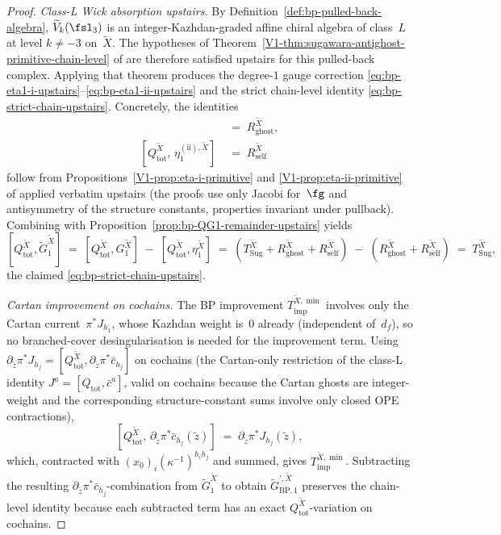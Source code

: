 \begin{proof}
\emph{Class-L Wick absorption upstairs.}
By
Definition~\ref{def:bp-pulled-back-algebra}, $\widetilde V_k(\fsl_3)$
is an integer-Kazhdan-graded affine chiral algebra of class~$L$ at
level $k \ne -3$ on~$\widetilde X$. The hypotheses of
Theorem~\ref{V1-thm:sugawara-antighost-primitive-chain-level} of
\cite[\S\ref*{V1-sec:strict-chain-level}]{Vol1-class-L-antighost}
are therefore satisfied upstairs for this pulled-back complex.
Applying that theorem produces the degree-$1$ gauge correction
\eqref{eq:bp-eta1-i-upstairs}--\eqref{eq:bp-eta1-ii-upstairs} and
the strict chain-level identity
\eqref{eq:bp-strict-chain-upstairs}. Concretely, the identities
\begin{align*}
 [Q_{\mathrm{tot}}^{\widetilde X},\, \eta_1^{(\mathrm i), \widetilde X}]
 &\;=\; R_{\mathrm{ghost}}^{\widetilde X},\\
 [Q_{\mathrm{tot}}^{\widetilde X},\, \eta_1^{(\mathrm{ii}), \widetilde X}]
 &\;=\; R_{\mathrm{self}}^{\widetilde X}
\end{align*}
follow from Propositions~\ref{V1-prop:eta-i-primitive} and
\ref{V1-prop:eta-ii-primitive} of
\cite[\S\ref*{V1-sec:eta1}]{Vol1-class-L-antighost} applied verbatim
upstairs (the proofs use only Jacobi for~$\fg$ and antisymmetry of
the structure constants, properties invariant under pullback).
Combining with
Proposition~\ref{prop:bp-QG1-remainder-upstairs} yields
\[
 [Q_{\mathrm{tot}}^{\widetilde X}, \widetilde G_1^{\widetilde X}]
 \;=\; [Q_{\mathrm{tot}}^{\widetilde X}, G_1^{\widetilde X}]
 \;-\; [Q_{\mathrm{tot}}^{\widetilde X}, \eta_1^{\widetilde X}]
 \;=\; (T_{\mathrm{Sug}}^{\widetilde X} + R_{\mathrm{ghost}}^{\widetilde X} + R_{\mathrm{self}}^{\widetilde X})
 \;-\; (R_{\mathrm{ghost}}^{\widetilde X} + R_{\mathrm{self}}^{\widetilde X})
 \;=\; T_{\mathrm{Sug}}^{\widetilde X},
\]
the claimed \eqref{eq:bp-strict-chain-upstairs}.

\emph{Cartan improvement on cochains.}
The BP improvement
$T_{\mathrm{imp}}^{\widetilde X, \min}$ involves only the Cartan
current~$\pi^{\ast}J_{h_1}$, whose Kazhdan weight is~$0$ already
(independent of~$d_f$), so no branched-cover desingularisation is
needed for the improvement term. Using
$\partial_{\tilde z}\pi^{\ast}J_{h_j} = [Q_{\mathrm{tot}}^{\widetilde X},
 \partial_{\tilde z}\pi^{\ast}\bar c_{h_j}]$ on cochains (the
Cartan-only restriction of the class-L identity
$J^a = [Q_{\mathrm{tot}}, \bar c^a]$, valid on cochains because the
Cartan ghosts are integer-weight and the corresponding structure-constant
sums involve only closed OPE contractions),
\[
 [Q_{\mathrm{tot}}^{\widetilde X},\,
 \partial_{\tilde z}\pi^{\ast}\bar c_{h_j}(\tilde z)]
 \;=\; \partial_{\tilde z}\pi^{\ast}J_{h_j}(\tilde z),
\]
which, contracted with $(x_0)_i (\kappa^{-1})^{h_i h_j}$ and summed, gives
$T_{\mathrm{imp}}^{\widetilde X, \min}$. Subtracting the resulting
$\partial_{\tilde z}\pi^{\ast}\bar c_{h_j}$-combination from
$\widetilde G_1^{\widetilde X}$ to obtain
$\widetilde G^{\prime, \widetilde X}_{\mathrm{BP}, 1}$ preserves
the chain-level identity because each subtracted term has an
exact $Q_{\mathrm{tot}}^{\widetilde X}$-variation on cochains.


\end{proof}
